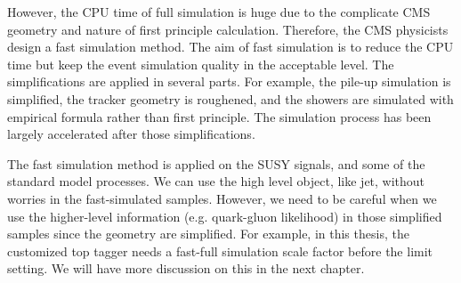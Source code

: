 However, the CPU time of full simulation is huge due to the complicate CMS geometry and nature of first principle calculation. Therefore, the CMS physicists design a fast simulation method\cite{1742-6596-396-6-062016}. The aim of fast simulation is to reduce the CPU time but keep the event simulation quality in the acceptable level. The simplifications are applied in several parts. For example, the pile-up simulation is simplified, the tracker geometry is roughened, and the showers are simulated with empirical formula rather than first principle. The simulation process has been largely accelerated after those simplifications. 

The fast simulation method is applied on the SUSY signals, and some of the standard model processes. We can use the high level object, like jet, without worries in the fast-simulated samples. However, we need to be careful when we use the higher-level information (e.g. quark-gluon likelihood) in those simplified samples since the geometry are simplified. For example, in this thesis, the customized top tagger needs a fast-full simulation scale factor before the limit setting. We will have more discussion on this in the next chapter. 
